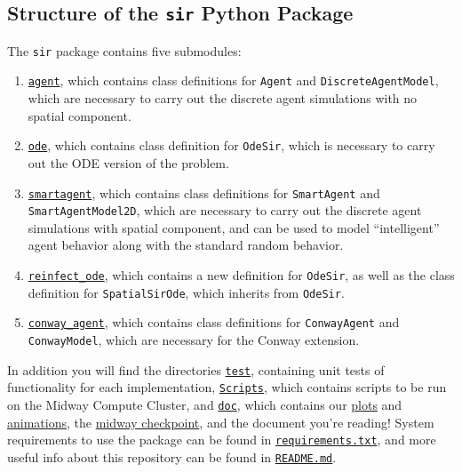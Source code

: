 \documentclass[twoside]{extarticle}                                    %
\numberwithin{equation}{section}                                       %
\begin{document}
\subsection{Structure of the \texttt{sir} Python Package}
The \texttt{sir} package contains five submodules:
\begin{enumerate}[label = (\roman*), itemsep = 0em]
    \item \href{https://github.com/caam37830/project-group-8/blob/main/sir/agent.py}{\texttt{agent}}, which contains class definitions for \texttt{Agent} and \texttt{DiscreteAgentModel}, which are necessary to carry out the discrete agent simulations with no spatial component.
    \item \href{https://github.com/caam37830/project-group-8/blob/main/sir/ode.py}{\texttt{ode}}, which contains class definition for \texttt{OdeSir}, which is necessary to carry out the ODE version of the problem.
    \item \href{https://github.com/caam37830/project-group-8/blob/main/sir/smartagent.py}{\texttt{smartagent}}, which contains class definitions for \texttt{SmartAgent} and \texttt{SmartAgentModel2D}, which are necessary to carry out the discrete agent simulations with spatial component, and can be used to model “intelligent” agent behavior along with the standard random behavior.
    \item \href{https://github.com/caam37830/project-group-8/blob/main/sir/reinfect_ode.py}{\texttt{reinfect\_ode}}, which contains a new definition for \texttt{OdeSir}, as well as the class definition for \texttt{SpatialSirOde}, which inherits from \texttt{OdeSir}.
    \item \href{https://github.com/caam37830/project-group-8/blob/main/sir/conway_agent.py}{\texttt{conway\_agent}}, which contains class definitions for \texttt{ConwayAgent} and \texttt{ConwayModel}, which are necessary for the Conway extension.
\end{enumerate}
In addition you will find the directories \href{https://github.com/caam37830/project-group-8/tree/main/test}{\texttt{test}}, containing unit tests of functionality for each implementation, \href{https://github.com/caam37830/project-group-8/tree/main/Scripts}{\texttt{Scripts}}, which contains scripts to be run on the Midway Compute Cluster, and \href{https://github.com/caam37830/project-group-8/tree/main/doc}{\texttt{doc}}, which contains our \href{https://github.com/caam37830/project-group-8/tree/main/doc/final/plots}{plots} and \href{https://github.com/caam37830/project-group-8/tree/main/doc/final/conway_plots}{animations}, the \href{https://github.com/caam37830/project-group-8/blob/main/doc/checkpoint/checkpoint.md}{midway checkpoint}, and the document you're reading! System requirements to use the package can be found in \href{https://github.com/caam37830/project-group-8/blob/main/requirements.txt}{\texttt{requirements.txt}}, and more useful info about this repository can be found in \href{https://github.com/caam37830/project-group-8/blob/main/README.md}{\texttt{README.md}}.
\end{document}
